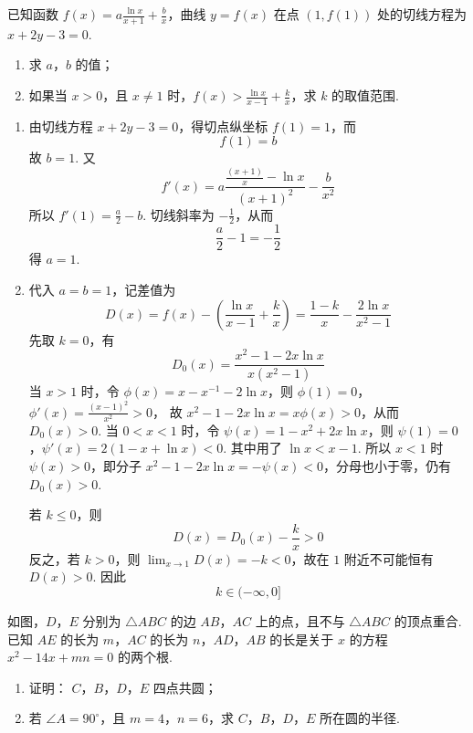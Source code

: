 \begin{problem}
已知函数 \( f(x) = a \frac{\ln x}{x + 1} + \frac{b}{x} \)，曲线 \( y = f(x) \) 在点 \(\left(1, f(1)\right)\) 处的切线方程为 \( x + 2y - 3 = 0 \).
\begin{enumerate}
    \item 求 \(a\)，\(b\) 的值；
\item 如果当 \(x > 0\)，且 \(x \neq 1\) 时，\(f(x) > \frac{\ln x}{x - 1} + \frac{k}{x}\)，求 \(k\) 的取值范围.
\end{enumerate}
\end{problem}

\begin{solution}
\begin{enumerate}
\item 由切线方程 \(x+2y-3=0\)，得切点纵坐标 \(f(1)=1\)，而
\[
f(1)=b
\]
故 \(b=1\). 又
\[
f'(x)=a\frac{\frac{(x+1)}{x}-\ln x}{(x+1)^{2}}-\frac{b}{x^{2}}
\]
所以 \(f'(1)=\frac{a}{2}-b\). 切线斜率为 \(-\frac{1}{2}\)，从而
\[
\frac a2-1=-\frac12
\]
得 \(a=1\).
\item 代入 \(a=b=1\)，记差值为
\[
D(x)=f(x)-\left(\frac{\ln x}{x-1}+\frac{k}{x}\right)
=\frac{1-k}{x}-\frac{2\ln x}{x^{2}-1}
\]
先取 \(k=0\)，有
\[
D_{0}(x)=\frac{x^{2}-1-2x\ln x}{x(x^{2}-1)}
\]
当 \(x>1\) 时，令 \(\phi(x)=x-x^{-1}-2\ln x\)，则 \(\phi(1)=0\)，\(\phi'(x)=\frac{(x-1)^{2}}{x^{2}}>0\)，
故 \(x^{2}-1-2x\ln x=x\phi(x)>0\)，从而 \(D_{0}(x)>0\). 当 \(0<x<1\) 时，令 \(\psi(x)=1-x^{2}+2x\ln x\)，则
\(\psi(1)=0\)，\(\psi'(x)=2(1-x+\ln x)<0\).
其中用了 \(\ln x<x-1\). 所以 \(x<1\) 时 \(\psi(x)>0\)，即分子 \(x^{2}-1-2x\ln x=-\psi(x)<0\)，分母也小于零，仍有 \(D_{0}(x)>0\).

若 \(k\leqslant0\)，则
\[
D(x)=D_{0}(x)-\frac{k}{x}>0
\]
反之，若 \(k>0\)，则 \(\lim_{x\to1}D(x)=-k<0\)，故在 \(1\) 附近不可能恒有 \(D(x)>0\). 因此
\[
k\in(-\infty,0]
\]
\end{enumerate}
\end{solution}

\begin{problem}
如图，\(D\)，\(E\) 分别为 \(\triangle ABC\) 的边 \(AB\)，\(AC\) 上的点，且不与 \(\triangle ABC\) 的顶点重合. 已知 \(AE\) 的长为 \(m\)，\(AC\) 的长为 \(n\)，\(AD\)，\(AB\) 的长是关于 \(x\) 的方程 \(x^{2} - 14x + mn = 0\) 的两个根.
\begin{enumerate}
\item 证明： \(C\)，\(B\)，\(D\)，\(E\) 四点共圆；
\item 若 \(\angle A = 90^{\circ}\)，且 \(m = 4\)，\(n = 6\)，求 \(C\)，\(B\)，\(D\)，\(E\) 所在圆的半径.
\end{enumerate}

\end{problem}

